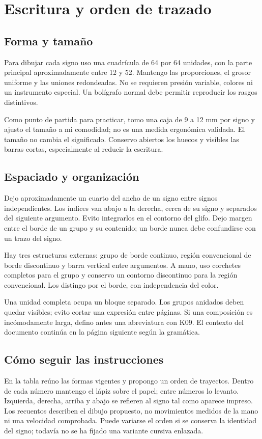 \section{Escritura y orden de trazado}\label{sec:escritura}

\subsection{Forma y tamaño}
Para dibujar cada signo uso una cuadrícula de 64 por 64 unidades, con la parte principal
aproximadamente entre 12 y 52. Mantengo las proporciones, el grosor uniforme y las
uniones redondeadas. No se requieren presión variable, colores ni un instrumento
especial. Un bolígrafo normal debe permitir reproducir los rasgos distintivos.

Como punto de partida para practicar, tomo una caja de 9 a 12 mm por signo y
ajusto el tamaño a mi comodidad; no es una medida ergonómica validada. El tamaño
no cambia el significado. Conservo abiertos los huecos y visibles las barras
cortas, especialmente al reducir la escritura.

\subsection{Espaciado y organización}
Dejo aproximadamente un cuarto del ancho de un signo entre signos independientes.
Los índices van abajo a la derecha, cerca de su signo y separados del siguiente
argumento. Evito integrarlos en el contorno del glifo. Dejo margen entre el borde
de un grupo y su contenido; un borde nunca debe confundirse con un trazo del signo.

Hay tres estructuras externas: grupo de borde continuo, región convencional
de borde discontinuo y barra vertical entre argumentos. A mano, uso corchetes
completos para el grupo y conservo un contorno discontinuo para la región
convencional. Los distingo por el borde, con independencia del color.

Una unidad completa ocupa un bloque separado. Los grupos anidados deben quedar
visibles; evito cortar una expresión entre páginas. Si una composición es
incómodamente larga, defino antes una abreviatura con K09. El contexto del
documento continúa en la página siguiente según la gramática.

\subsection{Cómo seguir las instrucciones}
En la tabla reúno las formas vigentes y propongo un orden de trayectos.
Dentro de cada número mantengo el lápiz sobre el papel; entre números lo
levanto. Izquierda, derecha, arriba y abajo se refieren al signo tal como aparece
impreso. Los recuentos describen el dibujo propuesto, no movimientos medidos de
la mano ni una velocidad comprobada. Puede variarse el orden si se conserva la
identidad del signo; todavía no se ha fijado una variante cursiva enlazada.

